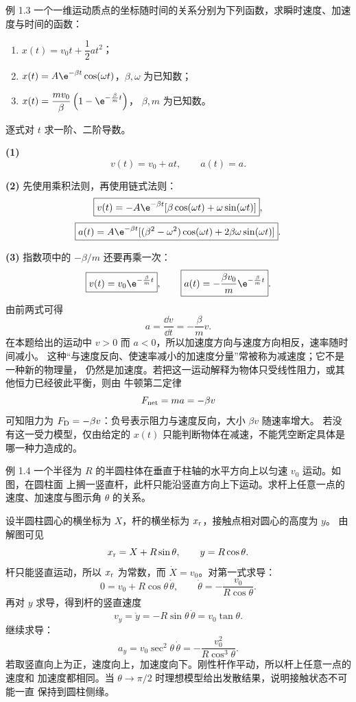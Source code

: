 \begin{origexamplebox}{例 1.3}
一个一维运动质点的坐标随时间的关系分别为下列函数，求瞬时速度、加速度与时间的函数：
\begin{enumerate}[label=\arabic*.,leftmargin=2.2em]
 \item $x(t)=v_0t+\dfrac12at^2$；
 \item $x(t)=A\e^{-\beta t}\cos(\omega t)$，$\beta,\omega$ 为已知数；
 \item $x(t)=\dfrac{mv_0}{\beta}\left(1-\e^{-\frac{\beta}{m}t}\right)$，
       $\beta,m$ 为已知数。
\end{enumerate}
\end{origexamplebox}

\begin{xesolution}
逐式对 $t$ 求一阶、二阶导数。

\textbf{(1)}
\[
 \boxed{v(t)=v_0+at},\qquad \boxed{a(t)=a}.
\]

\textbf{(2)} 先使用乘积法则，再使用链式法则：
\[
 \boxed{v(t)=-A\e^{-\beta t}
   [\beta\cos(\omega t)+\omega\sin(\omega t)]},
\]
\[
 \boxed{a(t)=A\e^{-\beta t}
   [(\beta^2-\omega^2)\cos(\omega t)
    +2\beta\omega\sin(\omega t)]}.
\]

\textbf{(3)} 指数项中的 $-\beta/m$ 还要再乘一次：
\[
 \boxed{v(t)=v_0\e^{-\frac{\beta}{m}t}},\qquad
 \boxed{a(t)=-\frac{\beta v_0}{m}\e^{-\frac{\beta}{m}t}}.
\]
由前两式可得
\[
 a=\frac{\dd v}{\dd t}=-\frac{\beta}{m}v.
\]
在本题给出的运动中 $v>0$ 而 $a<0$，所以加速度方向与速度方向相反，速率随时间减小。
这种“与速度反向、使速率减小的加速度分量”常被称为减速度；它不是一种新的物理量，
仍然是加速度。若把这一运动解释为物体只受线性阻力，或其他恒力已经彼此平衡，则由
牛顿第二定律
\[
 F_{\rm net}=ma=-\beta v
\]
可知阻力为 $F_{\rm D}=-\beta v$：负号表示阻力与速度反向，大小 $\beta v$ 随速率增大。
若没有这一受力模型，仅由给定的 $x(t)$ 只能判断物体在减速，不能凭空断定具体是哪一种力造成的。
\end{xesolution}

\Needspace{0.38\textheight}
\begin{origexamplebox}{例 1.4}
一个半径为 $R$ 的半圆柱体在垂直于柱轴的水平方向上以匀速 $v_0$ 运动。如图，在圆柱面
上搁一竖直杆，此杆只能沿竖直方向上下运动。求杆上任意一点的速度、加速度与图示角
$\theta$ 的关系。
\probdiagOneFour
\end{origexamplebox}

\begin{xesolution}
设半圆柱圆心的横坐标为 $X$，杆的横坐标为 $x_{\rm r}$，接触点相对圆心的高度为 $y$。
由解图可见
\[
 x_{\rm r}=X+R\sin\theta,\qquad y=R\cos\theta.
\]
杆只能竖直运动，所以 $x_{\rm r}$ 为常数，而 $\dot X=v_0$。对第一式求导：
\[
 0=v_0+R\cos\theta\,\dot\theta,\qquad
 \dot\theta=-\frac{v_0}{R\cos\theta}.
\]
再对 $y$ 求导，得到杆的竖直速度
\[
 v_y=\dot y=-R\sin\theta\,\dot\theta
 =\boxed{v_0\tan\theta}.
\]
\soldiagOneFour
继续求导：
\[
 a_y=v_0\sec^2\theta\,\dot\theta
 =\boxed{-\frac{v_0^2}{R\cos^3\theta}}.
\]
若取竖直向上为正，速度向上，加速度向下。刚性杆作平动，所以杆上任意一点的速度和
加速度都相同。当 $\theta\to\pi/2$ 时理想模型给出发散结果，说明接触状态不可能一直
保持到圆柱侧缘。
\end{xesolution}

